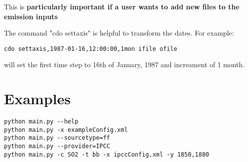 \documentclass[12pt]{article}
\begin{document}
This is {\bf particularly important if a user wants to add new files to the emission inputs}

The command "cdo settaxis" is helpful to transform the dates. For example: 
\begin{verbatim}
cdo settaxis,1987-01-16,12:00:00,1mon ifile ofile
\end{verbatim}
will set the first time step to 16th of January, 1987 and increament of 1 month.

\section{Examples}

\begin{verbatim}
python main.py --help
python main.py -x exampleConfig.xml
python main.py --sourcetype=ff
python main.py --provider=IPCC
python main.py -c SO2 -t bb -x ipccConfig.xml -y 1850,1880
\end{verbatim}
\end{document}
